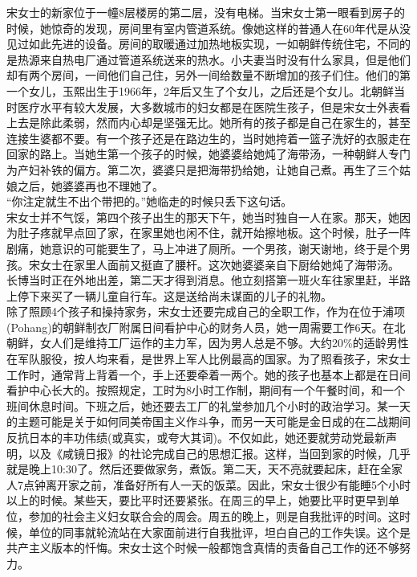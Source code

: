 \begin{multicols}{\theparacolNo}
宋女士的新家位于一幢8层楼房的第二层，没有电梯。当宋女士第一眼看到房子的时候，她惊奇的发现，房间里有室内管道系统。像她这样的普通人在60年代是从没见过如此先进的设备。房间的取暖通过加热地板实现，一如朝鲜传统住宅，不同的是热源来自热电厂通过管道系统送来的热水。小夫妻当时没有什么家具，但是他们却有两个房间，一间他们自己住，另外一间给数量不断增加的孩子们住。他们的第一个女儿，玉熙出生于1966年，2年后又生了个女儿，之后还是个女儿。北朝鲜当时医疗水平有较大发展，大多数城市的妇女都是在医院生孩子，但是宋女士外表看上去是除此柔弱，然而内心却是坚强无比。她所有的孩子都是自己在家生的，甚至连接生婆都不要。有一个孩子还是在路边生的，当时她挎着一篮子洗好的衣服走在回家的路上。当她生第一个孩子的时候，她婆婆给她炖了海带汤，一种朝鲜人专门为产妇补铁的偏方。第二次，婆婆只是把海带扔给她，让她自己煮。再生了三个姑娘之后，她婆婆再也不理她了。\\

“你注定就生不出个带把的。”她临走的时候只丢下这句话。\\

宋女士并不气馁，第四个孩子出生的那天下午，她当时独自一人在家。那天，她因为肚子疼就早点回了家，在家里她也闲不住，就开始擦地板。这个时候，肚子一阵剧痛，她意识的可能要生了，马上冲进了厕所。一个男孩，谢天谢地，终于是个男孩。宋女士在家里人面前又挺直了腰杆。这次她婆婆亲自下厨给她炖了海带汤。\\

长博当时正在外地出差，第二天才得到消息。他立刻搭第一班火车往家里赶，半路上停下来买了一辆儿童自行车。这是送给尚未谋面的儿子的礼物。\\

除了照顾4个孩子和操持家务，宋女士还要完成自己的全职工作，作为在位于浦项(Pohang)的朝鲜制衣厂附属日间看护中心的财务人员，她一周需要工作6天。在北朝鲜，女人们是维持工厂运作的主力军，因为男人总是不够。大约20\%的适龄男性在军队服役，按人均来看，是世界上军人比例最高的国家。为了照看孩子，宋女士工作时，通常背上背着一个，手上还要牵着一两个。她的孩子也基本上都是在日间看护中心长大的。按照规定，工时为8小时工作制，期间有一个午餐时间，和一个班间休息时间。下班之后，她还要去工厂的礼堂参加几个小时的政治学习。某一天的主题可能是关于如何同美帝国主义作斗争，而另一天可能是金日成的在二战期间反抗日本的丰功伟绩(或真实，或夸大其词)。不仅如此，她还要就劳动党最新声明，以及《咸镜日报》的社论完成自己的思想汇报。这样，当回到家的时候，几乎就是晚上10:30了。然后还要做家务，煮饭。第二天，天不亮就要起床，赶在全家人7点钟离开家之前，准备好所有人一天的饭菜。因此，宋女士很少有能睡5个小时以上的时候。某些天，要比平时还要紧张。在周三的早上，她要比平时更早到单位，参加的社会主义妇女联合会的周会。周五的晚上，则是自我批评的时间。这时候，单位的同事就轮流站在大家面前进行自我批评，坦白自己的工作失误。这个是共产主义版本的忏悔。宋女士这个时候一般都饱含真情的责备自己工作的还不够努力。\\


\end{multicols}
